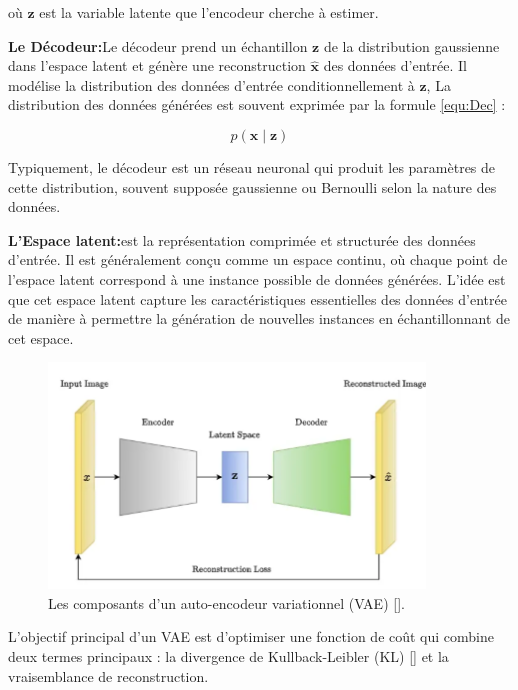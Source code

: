 où \(\mathbf{z}\) est la variable latente que l'encodeur cherche à estimer.

\medskip

\textbf{Le Décodeur:}Le décodeur prend un échantillon \(\mathbf{z}\) de la distribution gaussienne dans
l'espace latent et génère une reconstruction \(\hat{\mathbf{x}}\) des données d'entrée. Il modélise la distribution
des données d'entrée conditionnellement à \(\mathbf{z}\), La distribution des données générées est souvent exprimée par la formule \ref{equ:Dec} :

\begin{equation}
	p(\mathbf{x} \mid \mathbf{z})
	\label{equ:Dec}
\end{equation}

Typiquement, le décodeur est un réseau neuronal qui produit les paramètres de
cette distribution, souvent supposée gaussienne ou Bernoulli selon la nature
des données.

\medskip

\textbf{L'Espace latent:}est la représentation comprimée et structurée des données d'entrée.
Il est généralement conçu comme un espace continu, où chaque point de l'espace latent correspond à une instance
possible de données générées. L'idée est que cet espace latent capture les caractéristiques essentielles
des données d'entrée de manière à permettre
la génération de nouvelles instances en échantillonnant de cet espace.

\begin{figure}[hbt!]
	\centering
	\includegraphics[width=10cm]{images_pfe/vae_1.png}
	\caption{Les composants d'un auto-encodeur variationnel (VAE)  [\cite{kingma_welling_auto_encoding}].}
	\label{fig:VAE}
\end{figure}

L’objectif principal d’un VAE est d’optimiser une fonction de coût qui combine
deux termes principaux : la divergence de Kullback-Leibler (KL)
[\cite{johnson2001symmetrizing}] et la vraisemblance de reconstruction.

